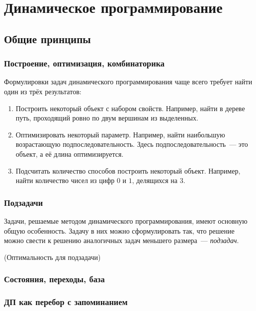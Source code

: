 \documentclass[a4paper,12pt]{article}
\begin{document}
  \section{Динамическое программирование}

    \subsection{Общие принципы}

      \subsubsection{Построение, оптимизация, комбинаторика}

      Формулировки задач динамического программирования чаще всего
      требует найти один из трёх результатов:

      \begin{enumerate}
        \item Построить некоторый объект с набором свойств. Например,
          найти в дереве путь, проходящий ровно по двум вершинам
          из выделенных.
        \item Оптимизировать некоторый параметр. Например, найти
          наибольшую возрастающую подпоследовательность. Здесь
          подпоследовательность~--- это объект, а её длина оптимизируется.
        \item Подсчитать количество способов построить некоторый
          объект. Например, найти количество чисел из цифр $0$ и $1$,
          делящихся на $3$.
      \end{enumerate}

      \subsubsection{Подзадачи}

      Задачи, решаемые методом динамического программирования,
      имеют основную общую особенность. Задачу в них можно сформулировать
      так, что решение можно свести к решению аналогичных задач меньшего
      размера~--- \emph{подзадач}.

      (Оптимальность для подзадачи)
      
      \subsubsection{Состояния, переходы, база}

      \subsubsection{ДП как перебор с запоминанием}
\end{document}
